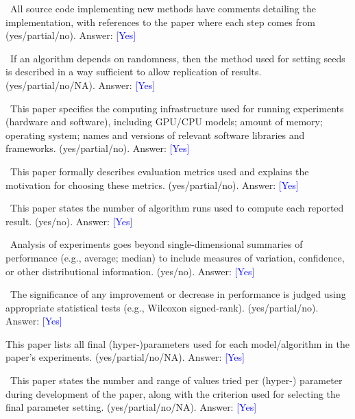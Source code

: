 \textbullet  \ All source code implementing new methods have comments detailing the implementation, with references to the paper where each step comes from (yes/partial/no). Answer: \textcolor{blue}{[Yes]}

\textbullet  \ If an algorithm depends on randomness, then the method used for setting seeds is described in a way sufficient to allow replication of results. (yes/partial/no/NA). Answer: \textcolor{blue}{[Yes]}

\textbullet  \ This paper specifies the computing infrastructure used for running experiments (hardware and software), including GPU/CPU models; amount of memory; operating system; names and versions of relevant software libraries and frameworks. (yes/partial/no). Answer: \textcolor{blue}{[Yes]}

\textbullet  \ This paper formally describes evaluation metrics used and explains the motivation for choosing these metrics. (yes/partial/no). Answer: \textcolor{blue}{[Yes]}

\textbullet  \ This paper states the number of algorithm runs used to compute each reported result. (yes/no). Answer: \textcolor{blue}{[Yes]}

\textbullet  \ Analysis of experiments goes beyond single-dimensional summaries of performance (e.g., average; median) to include measures of variation, confidence, or other distributional information. (yes/no). Answer: \textcolor{blue}{[Yes]}

\textbullet  \ The significance of any improvement or decrease in performance is judged using appropriate statistical tests (e.g., Wilcoxon signed-rank). (yes/partial/no). Answer: \textcolor{blue}{[Yes]}

This paper lists all final (hyper-)parameters used for each model/algorithm in the paper’s experiments. (yes/partial/no/NA). Answer: \textcolor{blue}{[Yes]}

\textbullet  \ This paper states the number and range of values tried per (hyper-) parameter during development of the paper, along with the criterion used for selecting the final parameter setting. (yes/partial/no/NA). Answer: \textcolor{blue}{[Yes]}